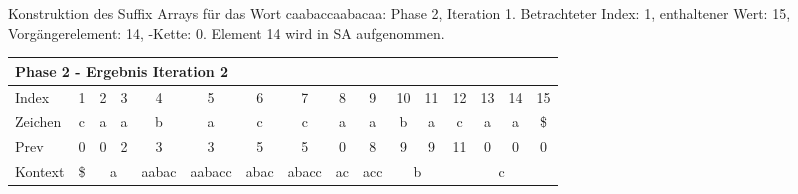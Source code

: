 \begin{table}[H]
\caption[Konstruktion des Suffix Arrays für das Wort caabaccaabacaa: Phase 2, Iteration 1]{Konstruktion des Suffix Arrays für das Wort caabaccaabacaa: Phase 2, Iteration 1. Betrachteter Index: 1, enthaltener Wert: 15, Vorgängerelement: 14, \prevpointer-Kette: 0. Element 14 wird in SA aufgenommen.}
\label{table_complex_example_2_1} 
\end{table}

\begin{table}[H]
\centering
\begin{adjustbox}{max width=\textwidth}
\centering
\begin{tabular}{lccccccccccccccc}
\multicolumn{16}{l}{Phase 2 - Ergebnis Iteration 2}                                                                                                                                                                                                                                                                                                                   \\ \hline
\multicolumn{1}{l|}{Index}   & 1                       & 2                          & 3                                               & 4                          & 5                           & 6                         & 7                          & 8                       & 9                        & 10 & 11                      & 12  & 13  & 14  & 15  \\
\multicolumn{1}{l|}{Zeichen} & c                       & a                          & a                                               & b                          & a                           & c                         & c                          & a                       & a                        & b  & a                       & c   & a   & a   & \$  \\
\multicolumn{1}{l|}{Prev}    & 0                       & 0                          & 2                                               & 3                          & 3                           & 5                         & 5                          & 0                       & 8                        & 9  & 9                       & 11  & 0   & 0   & 0   \\ \hline
\multicolumn{1}{l|}{Kontext} & \multicolumn{1}{c|}{\$} & \multicolumn{2}{c|}{a}                                                       & \multicolumn{1}{c|}{aabac} & \multicolumn{1}{c|}{aabacc} & \multicolumn{1}{c|}{abac} & \multicolumn{1}{c|}{abacc} & \multicolumn{1}{c|}{ac} & \multicolumn{1}{c|}{acc} & \multicolumn{2}{c|}{b}       & \multicolumn{4}{c}{c} \\

\end{tabular}
\end{adjustbox}
\end{table}
